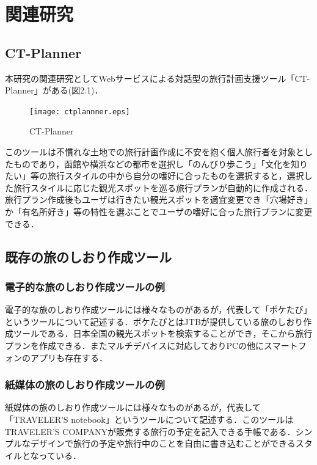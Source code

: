 \documentclass{funthesis}
\begin{document}
\chapter{関連研究}%

\section{CT-Planner}

本研究の関連研究としてWebサービスによる対話型の旅行計画支援ツール「CT-Planner」\cite{CTPlanner}がある(図2.1)．

\begin{figure}[htpb]
\begin{center}
\texttt{[image: ctplannner.eps]}
\end{center}
\caption{CT-Planner}
\end{figure}

このツールは不慣れな土地での旅行計画作成に不安を抱く個人旅行者を対象としたものであり，函館や横浜などの都市を選択し「のんびり歩こう」「文化を知りたい」等の旅行スタイルの中から自分の嗜好に合ったものを選択すると，選択した旅行スタイルに応じた観光スポットを巡る旅行プランが自動的に作成される．旅行プラン作成後もユーザは行きたい観光スポットを適宜変更でき「穴場好き」か「有名所好き」等の特性を選ぶことでユーザの嗜好に合った旅行プランに変更できる．


\section{既存の旅のしおり作成ツール}

\subsection{電子的な旅のしおり作成ツールの例}
電子的な旅のしおり作成ツールには様々なものがあるが，代表して「ポケたび」\cite{poketrip}というツールについて記述する．ポケたびとはJTBが提供している旅のしおり作成ツールである．日本全国の観光スポットを検索することができ，そこから旅行プランを作成できる．またマルチデバイスに対応しておりPCの他にスマートフォンのアプリも存在する．

\subsection{紙媒体の旅のしおり作成ツールの例}
紙媒体の旅のしおり作成ツールには様々なものがあるが，代表して「TRAVELER'S notebook」\cite{traver}というツールについて記述する．このツールはTRAVELER'S COMPANYが販売する旅行の予定を記入できる手帳である．シンプルなデザインで旅行の予定や旅行中のことを自由に書き込むことができるスタイルとなっている．
\end{document}
